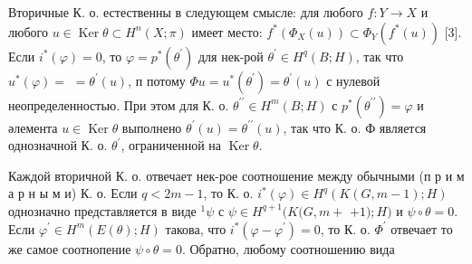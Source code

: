 \documentclass[10pt]{article}
\begin{document}
Вторичные К. о. естественны в следующем смысле: для любого $f: Y \rightarrow X$ и любого $u \in \operatorname{Ker} \theta \subset H^{n}(X ; \pi)$ имеет место: $f^{*}\left(\Phi_{X}(u)\right) \subset \Phi_{Y}\left(f^{*}(u)\right)$ [3]. Если $i^{*}(\varphi)=0$, то $\varphi=p^{*}\left(\theta^{\prime}\right)$ для нек-рой $\theta^{\prime} \in H^{q}(B ; H)$, так что $u^{*}(\varphi)=$ $=\theta^{\prime}(u)$, п потому $\Phi u=u^{*}\left(\theta^{\prime}\right)=\theta^{\prime}(u)$ с нулевой неопределенностью. При этом для К. о. $\theta^{\prime \prime} \in H^{m}(B ; H)$ с $p^{*}\left(\theta^{\prime \prime}\right)=\varphi$ и әлемента $u \in \operatorname{Ker} \theta$ выполнено $\theta^{\prime}(u)=\theta^{\prime \prime}(u)$, так что К. о. Ф является однозначной К. о. $\theta^{\prime}$, ограниченной на $\operatorname{Ker} \theta$.



Каждой вторичной К. о. отвечает нек-рое соотношение между обычными (п р и м а р н ы м и) К. о. Если $q<2 m-1$, то К. о. $i^{*}(\varphi) \in H^{q}(K(G, m-1) ; H)$ однозначно представляется в виде ${ }^{1} \psi$ с $\psi \in H^{q+1}(K(G, m+$ $+1) ; H)$ и $\psi \circ \theta=0$. Если $\varphi^{\prime} \in H^{m}(E(\theta) ; H)$ такова, что $i^{*}\left(\varphi-\varphi^{\prime}\right)=0$, то К. о. $\Phi^{\prime}$ отвечает то же самое соотнопение $\psi \circ \theta=0$. Обратно, любому соотношению вида
\end{document}
